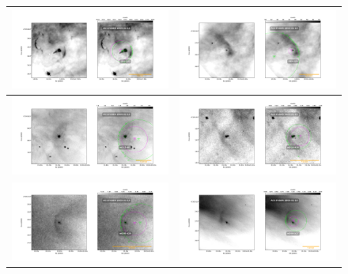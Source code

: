 \begin{figure}[htp]
\begin{tabular}{|l|l|}
   \includegraphics[width=0.47\linewidth,  trim=60 50 100 50, clip]{j8oc01010_wcs/180-331-Bally_01-images.pdf}
   &\includegraphics[width=0.47\linewidth,  trim=60 50 100 50, clip]{j8oc01010_wcs/189-329-Bally_01-images.pdf}\\ \hline
   \includegraphics[width=0.47\linewidth,  trim=60 50 100 50, clip]{j8oc01010_wcs/w012-407-Bally_01-images.pdf}
   &\includegraphics[width=0.47\linewidth,  trim=60 50 100 50, clip]{j8oc01010_wcs/w014-414-Bally_01-images.pdf}\\ \hline
   \includegraphics[width=0.47\linewidth,  trim=60 50 100 50, clip]{j8oc01010_wcs/w030-524-Bally_01-images.pdf}
    &\includegraphics[width=0.47\linewidth,  trim=60 50 100 50, clip]{j8oc01010_wcs/w044-527-Bally_01-images.pdf}\\ \hline
  
 \end{tabular}
\end{figure}


